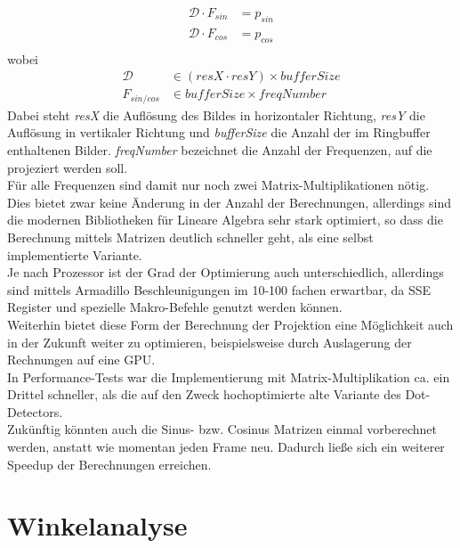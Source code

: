 \documentclass[11pt,a4paper]{article}
\begin{document}
\begin{align}
\mathcal{D} \cdot F_{sin} &= p_{sin} \\
\mathcal{D} \cdot F_{cos} &= p_{cos} \\
\end{align}
wobei
\begin{align*}
\mathcal{D} &\in (resX \cdot resY) \times bufferSize \\
F_{sin/cos} &\in bufferSize \times freqNumber
\end{align*}
Dabei steht \textit{resX} die Auflösung des Bildes in horizontaler Richtung, \textit{resY} die Auflösung in vertikaler Richtung und \textit{bufferSize} die Anzahl der im Ringbuffer enthaltenen Bilder. \textit{freqNumber} bezeichnet die Anzahl der Frequenzen, auf die projeziert werden soll.\\
Für alle Frequenzen sind damit nur noch zwei Matrix-Multiplikationen nötig. Dies bietet zwar keine Änderung in der Anzahl der Berechnungen, allerdings sind die modernen Bibliotheken für Lineare Algebra sehr stark optimiert, so dass die Berechnung mittels Matrizen deutlich schneller geht, als eine selbst implementierte Variante.\\
Je nach Prozessor ist der Grad der Optimierung auch unterschiedlich, allerdings sind mittels Armadillo Beschleunigungen im 10-100 fachen erwartbar, da SSE Register und spezielle Makro-Befehle genutzt werden können.\\
Weiterhin bietet diese Form der Berechnung der Projektion eine Möglichkeit auch in der Zukunft weiter zu optimieren, beispielsweise durch Auslagerung der Rechnungen auf eine GPU.\\
In Performance-Tests war die Implementierung mit Matrix-Multiplikation ca. ein Drittel schneller, als die auf den Zweck hochoptimierte alte Variante des Dot-Detectors.\\
Zukünftig könnten auch die Sinus- bzw. Cosinus Matrizen einmal vorberechnet werden, anstatt wie momentan jeden Frame neu. Dadurch ließe sich ein weiterer Speedup der Berechnungen erreichen.

\section{Winkelanalyse}%
\end{document}
